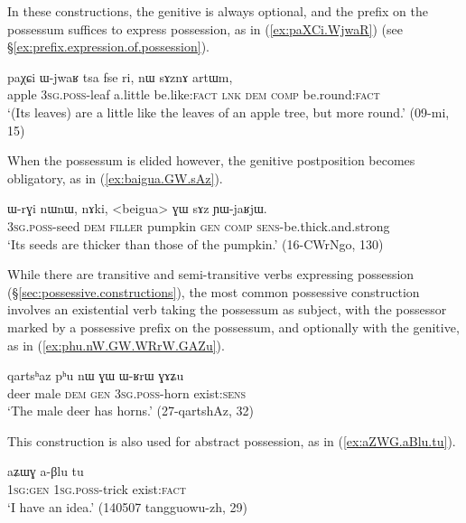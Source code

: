 In these constructions, the genitive is always optional, and the prefix on the possessum suffices to express possession, as in (\ref{ex:paXCi.WjwaR}) (see §\ref{ex:prefix.expression.of.possession}).

\begin{exe}
\ex \label{ex:paXCi.WjwaR}
\gll paχɕi ɯ-jwaʁ tsa fse ri, nɯ sɤznɤ artɯm,\\
apple \textsc{3sg}.\textsc{poss}-leaf a.little be.like:\textsc{fact} \textsc{lnk} \textsc{dem} \textsc{comp} be.round:\textsc{fact} \\
\glt `(Its leaves) are a little like the leaves of an apple tree, but more round.' (09-mi, 15)
\end{exe}

When the possessum is elided however, the genitive postposition becomes obligatory, as in (\ref{ex:baigua.GW.sAz}).

\begin{exe}
\ex \label{ex:baigua.GW.sAz}
\gll ɯ-rɣi nɯnɯ, nɤki, <beigua> ɣɯ sɤz ɲɯ-jaʁjɯ. \\
\textsc{3sg}.\textsc{poss}-seed \textsc{dem} \textsc{filler}  pumpkin \textsc{gen} \textsc{comp} \textsc{sens}-be.thick.and.strong \\
\glt `Its seeds are thicker than those of the pumpkin.' (16-CWrNgo, 130)
\end{exe}

While there are transitive and semi-transitive verbs expressing possession (§\ref{sec:possessive.constructions}), the most common possessive construction involves an existential verb taking the possessum as subject, with the possessor marked by a possessive prefix on the possessum, and optionally with the genitive, as in (\ref{ex:phu.nW.GW.WRrW.GAZu}). 

\begin{exe}
\ex \label{ex:phu.nW.GW.WRrW.GAZu}
\gll qartsʰaz pʰu nɯ ɣɯ ɯ-ʁrɯ ɣɤʑu \\
deer male \textsc{dem} \textsc{gen} \textsc{3sg}.\textsc{poss}-horn exist:\textsc{sens} \\
\glt `The male deer has horns.' (27-qartshAz, 32)
\end{exe}

This construction is also used for abstract possession, as in (\ref{ex:aZWG.aBlu.tu}).

\begin{exe}
\ex \label{ex:aZWG.aBlu.tu}
\gll aʑɯɣ a-βlu tu \\
\textsc{1sg}:\textsc{gen} \textsc{1sg}.\textsc{poss}-trick exist:\textsc{fact} \\
\glt `I have an idea.' (140507 tangguowu-zh, 29)
\end{exe}

